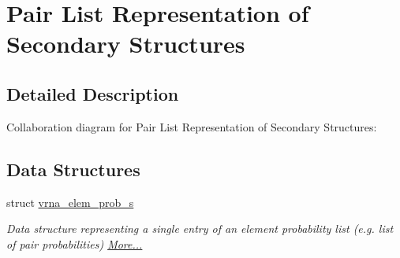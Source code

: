 \hypertarget{group__struct__utils__plist}{}\section{Pair List Representation of Secondary Structures}
\label{group__struct__utils__plist}


\subsection{Detailed Description}
Collaboration diagram for Pair List Representation of Secondary Structures\+:
\subsection*{Data Structures}
\begin{DoxyCompactItemize}
\item 
struct \mbox{\hyperlink{group__struct__utils__plist_structvrna__elem__prob__s}{vrna\+\_\+elem\+\_\+prob\+\_\+s}}
\begin{DoxyCompactList}\small\item\em Data structure representing a single entry of an element probability list (e.\+g. list of pair probabilities)  \mbox{\hyperlink{group__struct__utils__plist_structvrna__elem__prob__s}{More...}}\end{DoxyCompactList}\end{DoxyCompactItemize}

